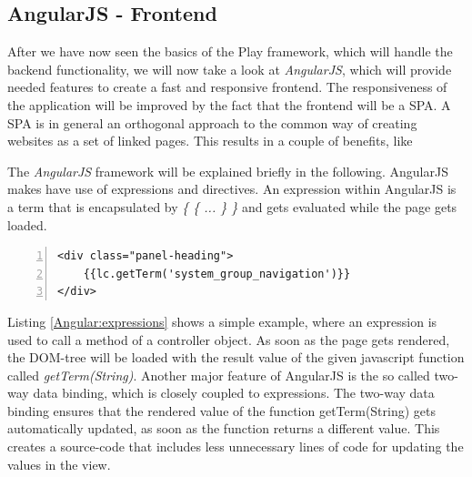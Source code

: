 \subsection{AngularJS - Frontend}
After we have now seen the basics of the Play framework, which will handle the backend functionality, we will now take a look at \textit{AngularJS}, which will provide needed features to create a fast and responsive frontend. The responsiveness of the application will be improved by the fact that the frontend will be a \ac{SPA}. A \ac{SPA} is in general an orthogonal approach to the common way of creating websites as a set of linked pages. This results in a couple of benefits, like


The \textit{AngularJS} framework will be explained briefly in the following. AngularJS makes have use of expressions and directives. An expression within AngularJS is a term that is encapsulated by \textit{\{ \{ ... \} \}} and gets evaluated while the page gets loaded.
\begin{lstlisting}[numbers=left,caption={Simple example that shows the use of expressions},label=Angular:expressions,frame=tlbr,breaklines]
<div class="panel-heading"> 
	{{lc.getTerm('system_group_navigation')}} 
</div>
\end{lstlisting}
Listing \ref{Angular:expressions} shows a simple example, where an expression is used to call a method of a controller object. As soon as the page gets rendered, the \ac{DOM}-tree will be loaded with the result value of the given javascript function called \textit{getTerm(String)}. 
Another major feature of AngularJS is the so called two-way data binding, which is closely coupled to expressions. The two-way data binding ensures that the rendered value of the function getTerm(String) gets automatically updated, as soon as the function returns a different value. This creates a source-code that includes less unnecessary lines of code for updating the values in the view. 

\begin{lstlisting}[numbers=left,caption={Simple example that shows the ng-class directive},label=Angular:ngclass,frame=tlbr,breaklines]

\end{lstlisting}

